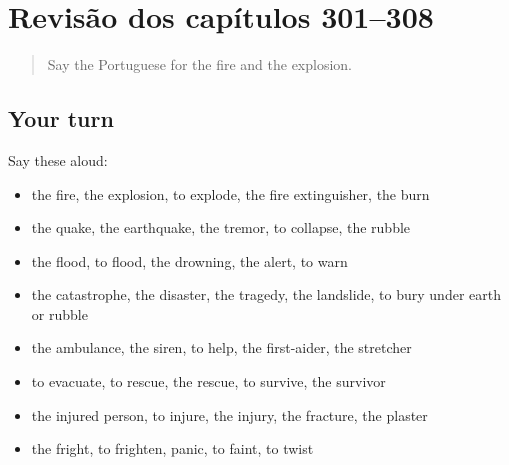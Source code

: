 \section[(dialogue)]{Revisão dos capítulos 301–308}

\label{lesson:PT-R308-revisao-301-308}



\begin{quote}
Say the Portuguese for the fire and the explosion.
\end{quote}

\subsection*{Your turn}
Say these aloud:

\begin{itemize}
\raggedright
  \item the fire, the explosion, to explode, the fire extinguisher, the burn
  \item the quake, the earthquake, the tremor, to collapse, the rubble
  \item the flood, to flood, the drowning, the alert, to warn
  \item the catastrophe, the disaster, the tragedy, the landslide, to bury under earth or rubble
  \item the ambulance, the siren, to help, the first-aider, the stretcher
  \item to evacuate, to rescue, the rescue, to survive, the survivor
  \item the injured person, to injure, the injury, the fracture, the plaster
  \item the fright, to frighten, panic, to faint, to twist
\end{itemize}

